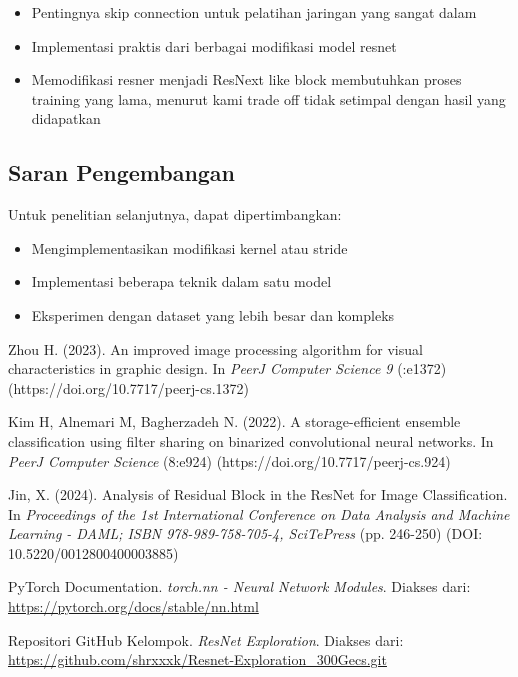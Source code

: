 \documentclass[11pt,a4paper]{article}
\begin{document}
\begin{itemize}
    \item Pentingnya skip connection untuk pelatihan jaringan yang sangat dalam
    \item Implementasi praktis dari berbagai modifikasi model resnet
    \item Memodifikasi resner menjadi ResNext like block membutuhkan proses training yang lama, menurut kami trade off tidak setimpal dengan hasil yang didapatkan
\end{itemize}

\subsection{Saran Pengembangan}

Untuk penelitian selanjutnya, dapat dipertimbangkan:

\begin{itemize}
    \item Mengimplementasikan modifikasi kernel atau stride
    \item Implementasi beberapa teknik dalam satu model
    \item Eksperimen dengan dataset yang lebih besar dan kompleks
\end{itemize}

\newpage

\begin{thebibliography}{9}

Zhou H. (2023). An improved image processing algorithm for visual characteristics in graphic design. In \textit{PeerJ Computer Science 9} (:e1372) (https://doi.org/10.7717/peerj-cs.1372)

Kim H, Alnemari M, Bagherzadeh N. (2022). A storage-efficient ensemble classification using filter sharing on binarized convolutional neural networks. In \textit{PeerJ Computer Science} (8:e924) (https://doi.org/10.7717/peerj-cs.924)

Jin, X. (2024). Analysis of Residual Block in the ResNet for Image Classification. In \textit{Proceedings of the 1st International Conference on Data Analysis and Machine Learning - DAML; ISBN 978-989-758-705-4, SciTePress} (pp. 246-250) (DOI: 10.5220/0012800400003885)


PyTorch Documentation. \textit{torch.nn - Neural Network Modules}. Diakses dari: \url{https://pytorch.org/docs/stable/nn.html}

Repositori GitHub Kelompok. \textit{ResNet Exploration}. Diakses dari: \url{https://github.com/shrxxxk/Resnet-Exploration_300Gecs.git}

\end{thebibliography}
\end{document}
